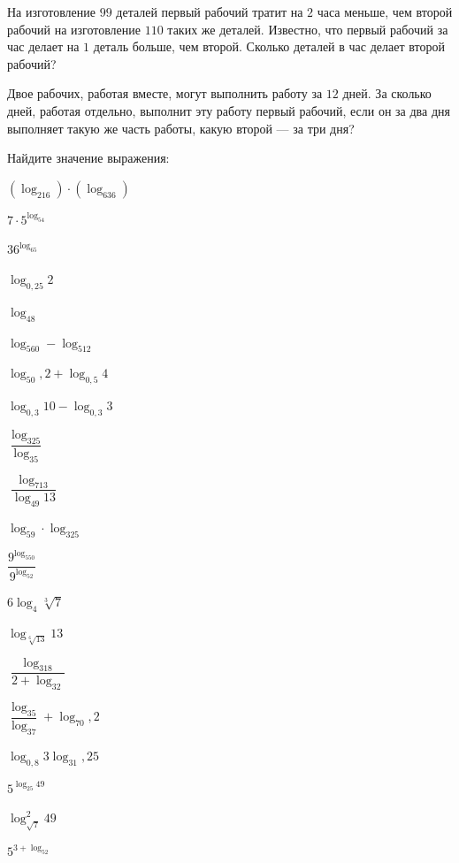 \begin{class}[number=6]
\begin{listofex}
		\item На изготовление \( 99 \) деталей первый рабочий тратит на \( 2 \) часа меньше, чем второй рабочий на изготовление \( 110 \) таких же деталей. Известно, что первый рабочий за час делает на \( 1 \) деталь больше, чем второй. Сколько деталей в час делает второй рабочий?
		\item Двое рабочих, работая вместе, могут выполнить работу за \( 12 \) дней. За сколько дней, работая отдельно, выполнит эту работу первый рабочий, если он за два дня выполняет такую же часть работы, какую второй --- за три дня?
	\end{listofex}
\end{class}
%
%
\begin{class}[number=6]
	\begin{listofex}
		\item {}
		\item Найдите значение выражения:
		\begin{enumcols}[itemcolumns=3]
			\item \( (\log_216)\cdot(\log_636) \)
			\item \( 7\cdot5^{\log_54} \)
			\item \( 36^{\log_65} \)
			\item \( \log_{0,25}2 \)
			\item \( \log_48 \)
			\item \( \log_560-\log_512 \)
			\item \( \log_50,2+\log_{0,5}4 \)
			\item \( \log_{0,3}10-\log_{0,3}3 \)
			\item \( \dfrac{\log_325}{\log_35} \)
			\item \( \dfrac{\log_713}{\log_{49}13} \)
			\item \( \log_59\cdot\log_325 \)
			\item \( \dfrac{9^{\log_550}}{9^{\log_52}} \)
			\item \( 6\log_4\sqrt[3]{7} \)
			\item \( \log_{\sqrt[6]{13}}13 \)
			\item \( \dfrac{\log_318}{2+\log_32} \)
			\item \( \dfrac{\log_35}{\log_37}+\log_70,2 \)
			\item \( \log_{0,8}3\log_31,25 \)
			\item \( 5^{\log_{25}49} \)
			\item \( \log^2_{\sqrt{7}}49 \)
			\item \( 5^{3+\log_52} \)

\end{enumcols}
\end{listofex}
\end{class}
